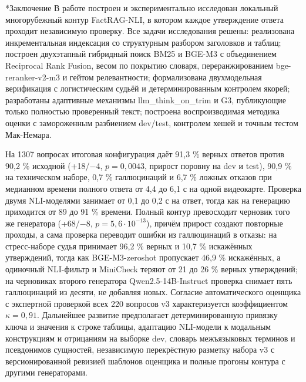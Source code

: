 \documentclass[14pt,a4paper]{extarticle}
\makeatletter
\renewcommand\section{\@startsection{section}{1}{\z@}{12pt plus 2pt}{6pt}{\normalfont\normalsize\bfseries\raggedright}}
\makeatother
\begin{document}
\section*{Заключение}
В работе построен и экспериментально исследован локальный многорубежный контур FactRAG-NLI, в котором каждое утверждение ответа проходит независимую проверку. Все задачи исследования решены: реализована инкрементальная индексация со структурным разбором заголовков и таблиц; построен двухэтапный гибридный поиск BM25 и BGE-M3 с объединением Reciprocal Rank Fusion, весом по покрытию словаря, переранжированием bge-reranker-v2-m3 и гейтом релевантности; формализована двухмодельная верификация с логистическим судьёй и детерминированным контролем якорей; разработаны адаптивные механизмы llm\_think\_on\_trim и G3, публикующие только полностью проверенный текст; построена воспроизводимая методика оценки с замороженным разбиением dev/test, контролем хешей и точным тестом Мак-Немара.

На 1307 вопросах итоговая конфигурация даёт 91,3 \% верных ответов против 90,2 \% исходной (+18/−4, $p = 0{,}0043$, прирост поровну на dev и test), 90,9 \% на техническом наборе, 0,7 \% галлюцинаций и 6,7 \% ложных отказов при медианном времени полного ответа от 4,4 до 6,1 с на одной видеокарте. Проверка двумя NLI-моделями занимает от 0,1 до 0,2 с на ответ, тогда как на генерацию приходится от 89 до 91 \% времени. Полный контур превосходит черновик того же генератора (+68/−8, $p = 5{,}6 \cdot 10^{-13}$), причём прирост создают повторные проходы, а сама проверка переводит ошибки из галлюцинаций в отказы: на стресс-наборе судья принимает 96,2 \% верных и 10,7 \% искажённых утверждений, тогда как BGE-M3-zeroshot пропускает 46,9 \% искажённых, а одиночный NLI-фильтр и MiniCheck теряют от 21 до 26 \% верных утверждений; на черновиках второго генератора Qwen2.5-14B-Instruct проверка снимает пять галлюцинаций из десяти, не добавляя новых. Согласие автоматического оценщика с экспертной проверкой всех 220 вопросов v3 характеризуется коэффициентом $\kappa = 0{,}91$. Дальнейшее развитие предполагает детерминированную привязку ключа и значения к строке таблицы, адаптацию NLI-модели к модальным конструкциям и отрицаниям на выборке dev, словарь межъязыковых терминов и псевдонимов сущностей, независимую перекрёстную разметку набора v3 с версионированной ревизией шаблонов оценщика и полные прогоны контура с другими генераторами.
\end{document}
